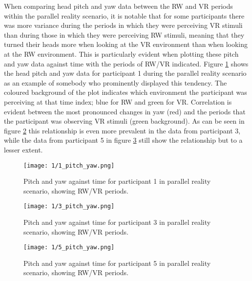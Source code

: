 When comparing head pitch and yaw data between the RW and VR periods within the parallel reality scenario, it is notable that for some participants there was more variance during the periods in which they were perceiving VR stimuli than during those in which they were perceiving RW stimuli, meaning that they turned their heads more when looking at the VR environment than when looking at the RW environment. This is particularly evident when plotting these pitch and yaw data against time with the periods of RW/VR indicated. Figure \ref{1_pitch_yaw.png} shows the head pitch and yaw data for participant 1 during the parallel reality scenario as an example of somebody who prominently displayed this tendency. The coloured background of the plot indicates which environment the participant was perceiving at that time index; blue for RW and green for VR. Correlation is evident between the most pronounced changes in yaw (red) and the periods that the participant was observing VR stimuli (green background). As can be seen in figure \ref{3_pitch_yaw.png} this relationship is even more prevalent in the data from participant 3, while the data from participant 5 in figure \ref{5_pitch_yaw.png} still show the relationship but to a lesser extent.

\begin{figure}
	\begin{center}
	\texttt{[image: 1/1\_pitch\_yaw.png]}
	\caption{Pitch and yaw against time for participant 1 in parallel reality scenario, showing RW/VR periods.}
	\label{1_pitch_yaw.png}
	\end{center}
\end{figure}

\begin{figure}
	\begin{center}
	\texttt{[image: 1/3\_pitch\_yaw.png]}
	\caption{Pitch and yaw against time for participant 3 in parallel reality scenario, showing RW/VR periods.}
	\label{3_pitch_yaw.png}
	\end{center}
\end{figure}

\begin{figure}
	\begin{center}
	\texttt{[image: 1/5\_pitch\_yaw.png]}
	\caption{Pitch and yaw against time for participant 5 in parallel reality scenario, showing RW/VR periods.}
	\label{5_pitch_yaw.png}
	\end{center}
\end{figure}

